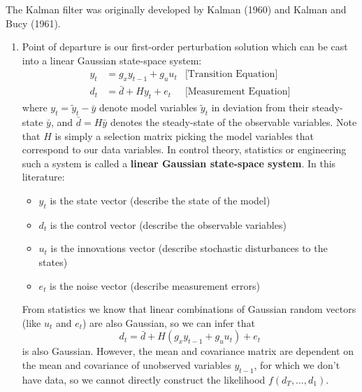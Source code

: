 The Kalman filter was originally developed by Kalman (1960) and Kalman and Bucy (1961).

\begin{enumerate}

\item Point of departure is our first-order perturbation solution which can be cast into a linear Gaussian state-space system:
\begin{align*}
	y_t &= g_x y_{t-1} + g_u u_t &\text{[Transition Equation]}
\\
d_t &= \bar{d} + H y_t + e_t       &\text{[Measurement Equation]}
\end{align*}
where \(y_t=\tilde{y}_t-\bar{y}\) denote model variables \(\tilde{y}_t\) in deviation from their steady-state \(\bar{y}\),
and \(\bar{d}=H\bar{y}\) denotes the steady-state of the observable variables.
Note that \(H\) is simply a selection matrix picking the model variables that correspond to our data variables.
In control theory, statistics or engineering such a system is called a \textbf{linear Gaussian state-space system}.
In this literature:
\begin{itemize}
\item \(y_t\) is the state vector (describe the state of the model)
\item \(d_t\) is the control vector (describe the observable variables)
\item \(u_t\) is the innovations vector (describe stochastic disturbances to the states)
\item \(e_t\) is the noise vector (describe measurement errors)
\end{itemize}
From statistics we know that linear combinations of Gaussian random vectors (like \(u_t\) and \(e_t\)) are also Gaussian,
  so we can infer that
\begin{equation*}
d_t = \bar{d} +  H(g_x y_{t-1} + g_u u_t) + e_t
\end{equation*}
is also Gaussian.
However, the mean and covariance matrix are dependent on the mean and covariance of unobserved variables \(y_{t-1}\),
  for which we don't have data, so we cannot directly construct the likelihood \(f(d_T,\ldots ,d_1)\).
	

\end{enumerate}
